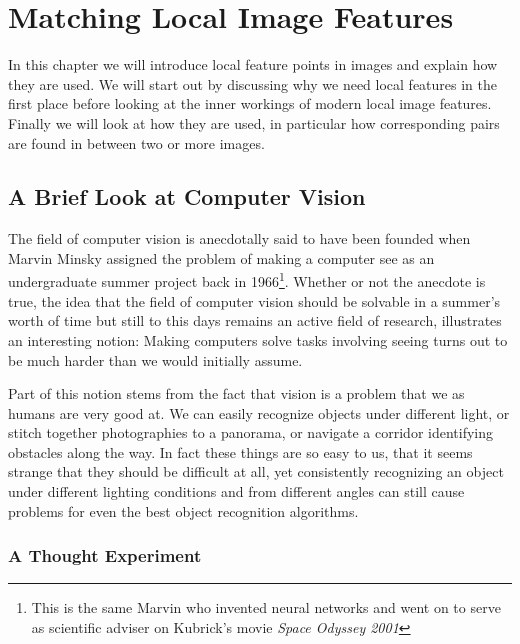 \chapter{Matching Local Image Features}

In this chapter we will introduce local feature points in images and 
explain how they are used. We will start out by discussing why we need 
local features in the first place before looking at the inner workings 
of modern local image features. Finally we will look at how they are 
used, in particular how corresponding pairs are found in between two or 
more images.

\section{A Brief Look at Computer Vision}

The field of computer vision is anecdotally said to have been founded 
when Marvin Minsky assigned the problem of making a computer see as an 
undergraduate summer project back in 1966\footnote{This is the same 
Marvin who invented neural networks and went on to serve as scientific 
adviser on Kubrick's movie \emph{Space Odyssey 2001}}. Whether or not 
the anecdote is true, the idea that the field of computer vision should 
be solvable in a summer's worth of time but still to this days remains 
an active field of research, illustrates an interesting notion: Making 
computers solve tasks involving seeing turns out to be much harder than 
we would initially assume.

Part of this notion stems from the fact that vision is a problem that we 
as humans are very good at. We can easily recognize objects under 
different light, or stitch together photographies to a panorama, or 
navigate a corridor identifying obstacles along the way. In fact these 
things are so easy to us, that it seems strange that they should be 
difficult at all, yet consistently recognizing an object under different 
lighting conditions and from different angles can still cause problems 
for even the best object recognition algorithms.

\subsection{A Thought Experiment}

